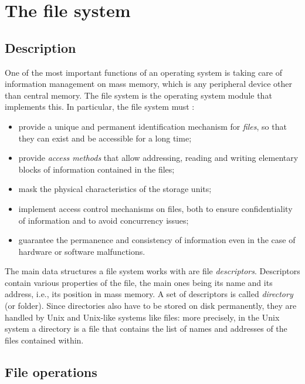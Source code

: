 \documentclass[a4paper,12pt,twoside,openright]{report}
\begin{document}
  \clearpage
  \section{The file system}

  \label{filesystem-descrizione}
  \subsection{Description}

  One of the most important functions of an operating system is taking care of information management on mass memory,
  which is any peripheral device other than central memory.
  The file system is the operating system module that implements this.
  In particular, the file system must \cite{sistemioperativi}:

  \begin{itemize}
    \item provide a unique and permanent identification mechanism for \textit{files},
          so that they can exist and be accessible for a long time;
    \item provide \textit{access methods} that allow addressing, reading and writing
          elementary blocks of information contained in the files;
    \item mask the physical characteristics of the storage units;
    \item implement access control mechanisms on files, both to ensure confidentiality of information and to avoid concurrency issues;
    \item guarantee the permanence and consistency of information even in the case of hardware or software malfunctions.
  \end{itemize}

  The main data structures a file system works with are file \textit{descriptors}.
  Descriptors contain various properties of the file, the main ones being its name and its address, i.e.,
  its position in mass memory.
  A set of descriptors is called \textit{directory} (or folder). Since directories also have to be
  stored on disk permanently, they are handled by Unix and Unix-like systems like files: more precisely,
  in the Unix system a directory is a file that contains the list of names and addresses of the files
  contained within.
  
  \clearpage
  \subsection{File operations}
\end{document}
